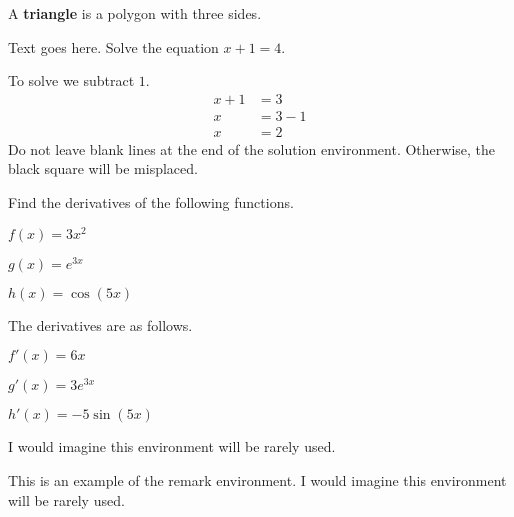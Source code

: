 \documentclass[10pt,oneside]{book}
\begin{document}
\begin{definition}[Triangle]
  A \textbf{triangle} is a polygon with three sides.
\end{definition}


\begin{example}
  Text goes here.  Solve the equation $x +1 = 4$.
\end{example}


\begin{solution}
  To solve we subtract $1$.
  \begin{align*}
    x + 1 &= 3     \\
        x &= 3 - 1 \\
        x &= 2
  \end{align*}
  Do not leave blank lines at the end of the solution environment.
  Otherwise, the black square will be misplaced.
\end{solution}


\begin{example}
  Find the derivatives of the following functions.
  \begin{ienumerate}
    \item
      $f(x) = 3x^2$
    \item
      $g(x) = e^{3x}$
    \item
      $h(x) = \cos(5x)$
  \end{ienumerate}
\end{example}


\begin{solution}
The derivatives are as follows.
  \begin{ienumerate}
    \item
      $f'(x) = 6x$
    \item
      $g'(x) = 3e^{3x}$
    \item
      $h'(x) = -5\sin(5x)$
  \end{ienumerate}
\end{solution}


\begin{exercise}
  I would imagine this environment will be rarely used.
\end{exercise}


\begin{remark}
  This is an example of the remark environment.
  I would imagine this environment will be rarely used.
\end{remark}
\end{document}
